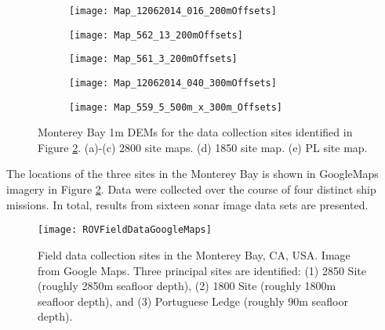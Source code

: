 \begin{figure} [H]
	\centering
	\begin{subfigure}[b]{0.43\textwidth}
                \texttt{[image: Map\_12062014\_016\_200mOffsets]}
                \caption{}
	\end{subfigure}
	\hspace{8ex}
  	\centering
	\begin{subfigure}[b]{0.43\textwidth}
                \texttt{[image: Map\_562\_13\_200mOffsets]}
		\caption{}
  	\end{subfigure}
  	
  	\centering
	\begin{subfigure}[b]{0.43\textwidth}
                \texttt{[image: Map\_561\_3\_200mOffsets]}
		\caption{}
  	\end{subfigure}
  	\hspace{8ex}
  	\centering
	\begin{subfigure}[b]{0.43\textwidth}
                \texttt{[image: Map\_12062014\_040\_300mOffsets]}
		\caption{}
  	\end{subfigure}
  	
  	\centering
	\begin{subfigure}[b]{0.8\textwidth}
                \texttt{[image: Map\_559\_5\_500m\_x\_300m\_Offsets]}
		\caption{}
  	\end{subfigure}
  	
	\caption{Monterey Bay 1m DEMs for the data collection sites identified in Figure \ref{fig:ROVGoogle}. (a)-(c) 2800 site maps. (d) 1850 site map. (e) PL site map. }
	\label{fig:rovSitesDEMs}
\end{figure}

The locations of the three sites in the Monterey Bay is shown in GoogleMaps imagery in Figure \ref{fig:ROVGoogle}.
Data were collected over the course of four distinct ship missions.
In total, results from sixteen sonar image data sets are presented.

\begin{figure}[H]
	\centering
	\texttt{[image: ROVFieldDataGoogleMaps]}
	\caption{Field data collection sites in the Monterey Bay, CA, USA.  Image from Google Maps. Three principal sites are identified: (1) 2850 Site (roughly 2850m seafloor depth), (2) 1800 Site (roughly 1800m seafloor depth), and (3) Portuguese Ledge (roughly 90m seafloor depth).}
	\label{fig:ROVGoogle}
\end{figure}

